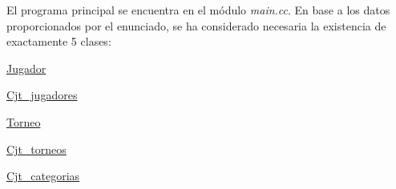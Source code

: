 El programa principal se encuentra en el módulo {\itshape main.\+cc}. En base a los datos proporcionados por el enunciado, se ha considerado necesaria la existencia de exactamente 5 clases\+: 
\begin{DoxyItemize}
\item \mbox{\hyperlink{class_jugador}{Jugador}} 
\item \mbox{\hyperlink{class_cjt__jugadores}{Cjt\+\_\+jugadores}} 
\item \mbox{\hyperlink{class_torneo}{Torneo}} 
\item \mbox{\hyperlink{class_cjt__torneos}{Cjt\+\_\+torneos}} 
\item \mbox{\hyperlink{class_cjt__categorias}{Cjt\+\_\+categorias}} 
\end{DoxyItemize}